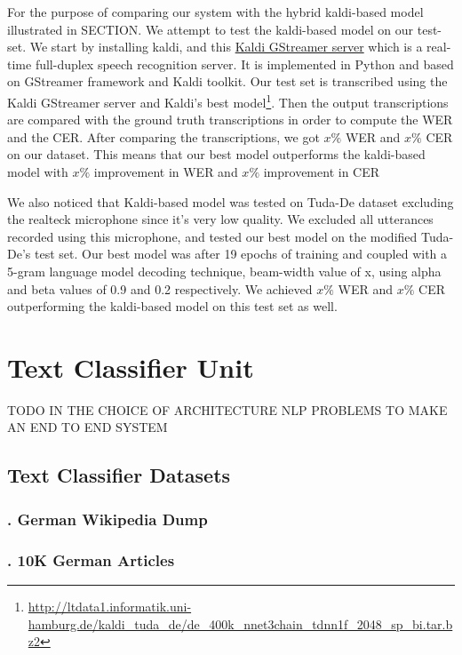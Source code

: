


For the purpose of comparing our system with the hybrid kaldi-based model \cite{milde2018open} illustrated in SECTION. We attempt to test the kaldi-based model on our test-set. We start by installing kaldi, and this \href{https://github.com/alumae/kaldi-gstreamer-server}{Kaldi GStreamer server} which is a real-time full-duplex speech recognition server. It is implemented in Python and based on GStreamer framework and Kaldi toolkit. Our test set is transcribed using the Kaldi GStreamer server and Kaldi's best model\footnote{\url{http://ltdata1.informatik.uni-hamburg.de/kaldi_tuda_de/de_400k_nnet3chain_tdnn1f_2048_sp_bi.tar.bz2}}. Then the output transcriptions are compared with the ground truth transcriptions in order to compute the \ac{WER} and the \ac{CER}. After comparing the transcriptions, we got $x\%$ \ac{WER} and  $x\%$ \ac{CER} on our dataset. This means that our best model outperforms the kaldi-based model with $x\%$ improvement in \ac{WER} and $x\%$ improvement in \ac{CER}

We also noticed that Kaldi-based model was tested on Tuda-De dataset excluding the realteck microphone since it's very low quality. We excluded all utterances recorded using this microphone, and tested our best model on the modified Tuda-De's test set. Our best model was after 19 epochs of training and coupled with a 5-gram language model decoding technique, beam-width value of x, using alpha and beta values of 0.9 and 0.2 respectively. We achieved $x\%$ \ac{WER} and $x\%$ \ac{CER} outperforming the kaldi-based model on this test set as well.



\section{Text Classifier Unit} 
\label{meth:s3}

TODO IN THE CHOICE OF ARCHITECTURE NLP PROBLEMS TO MAKE AN END TO END SYSTEM


\subsection{Text Classifier Datasets}
\label{meth:sub2}

\subsubsection{. German Wikipedia Dump}
\label{meth:subsub4}
\subsubsection{. 10K German Articles}
\label{meth:subsub5}

